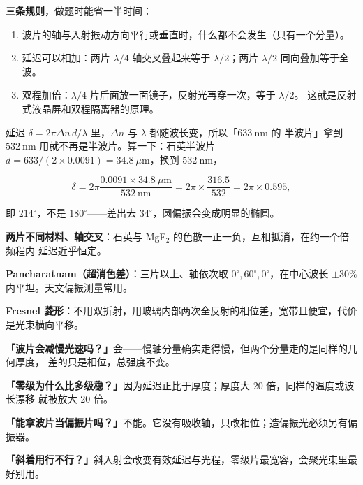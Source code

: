\documentclass[11pt]{ctexart}
\let\subhdrtheme\subhdr
\renewcommand{\subhdr}[1]{\needspace{3\baselineskip}\subhdrtheme{#1}}
\let\hdrorig\hdr
\renewcommand{\hdr}[2]{\needspace{8\baselineskip}\hdrorig{#1}{#2}}
\begin{document}
\textbf{三条规则}，做题时能省一半时间：

\begin{enumerate}[label=（\arabic*）,leftmargin=2.4em]
\item 波片的轴与入射振动方向平行或垂直时，什么都不会发生（只有一个分量）。
\item 延迟可以相加：两片 $\lambda/4$ 轴交叉叠起来等于 $\lambda/2$；两片 $\lambda/2$ 同向叠加等于全波。
\item 双程加倍：$\lambda/4$ 片后面放一面镜子，反射光再穿一次，等于 $\lambda/2$。
这就是反射式液晶屏和双程隔离器的原理。
\end{enumerate}



延迟 $\delta=2\pi\Delta n\,d/\lambda$ 里，$\Delta n$ 与 $\lambda$ 都随波长变，所以「$633\ \mathrm{nm}$ 的
半波片」拿到 $532\ \mathrm{nm}$ 用就不再是半波片。算一下：石英半波片
$d=633/(2\times0.0091)=34.8\ \mu\mathrm{m}$，换到 $532\ \mathrm{nm}$，

\[
\delta=2\pi\frac{0.0091\times34.8\ \mu\mathrm{m}}{532\ \mathrm{nm}}
=2\pi\times\frac{316.5}{532}=2\pi\times0.595 ,
\]

即 $214^\circ$，不是 $180^\circ$——差出去 $34^\circ$，圆偏振会变成明显的椭圆。


\textbf{两片不同材料、轴交叉}：石英与 MgF$_2$ 的色散一正一负，互相抵消，在约一个倍频程内
延迟近乎恒定。

\textbf{Pancharatnam（超消色差）}：三片以上、轴依次取 $0^\circ,60^\circ,0^\circ$，在中心波长
$\pm30\%$ 内平坦。天文偏振测量常用。

\textbf{Fresnel 菱形}：不用双折射，用玻璃内部两次全反射的相位差，宽带且便宜，代价是光束横向平移。


\textbf{「波片会减慢光速吗？」}会——慢轴分量确实走得慢，但两个分量走的是同样的几何厚度，
差的只是相位，总强度不变。

\textbf{「零级为什么比多级稳？」}因为延迟正比于厚度；厚度大 $20$ 倍，同样的温度或波长漂移
就被放大 $20$ 倍。

\textbf{「能拿波片当偏振片吗？」}不能。它没有吸收轴，只改相位；造偏振光必须另有偏振器。

\textbf{「斜着用行不行？」}斜入射会改变有效延迟与光程，零级片最宽容，会聚光束里最好别用。
\end{document}
